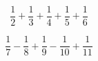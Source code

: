 \begin{multicols}{2}
    $$\dfrac{1}{2}+\dfrac{1}{3}+\dfrac{1}{4}+\dfrac{1}{5}+\dfrac{1}{6}$$

    $$\dfrac{1}{7}-\dfrac{1}{8}+\dfrac{1}{9}-\dfrac{1}{10}+\dfrac{1}{11}$$
\end{multicols}

